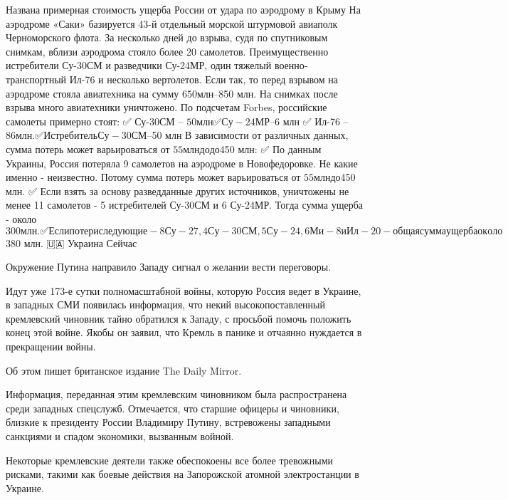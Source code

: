  
 
 
 
 

Названа примерная стоимость ущерба России от удара по аэродрому в Крыму
На аэродроме «Саки» базируется 43-й отдельный морской штурмовой авиаполк Черноморского флота. За несколько дней до взрыва, судя по спутниковым снимкам, вблизи аэродрома стояло более 20 самолетов. Преимущественно истребители Су-30СМ и разведчики Су-24МР, один тяжелый военно-транспортный Ил-76 и несколько вертолетов. Если так, то перед взрывом на аэродроме стояла авиатехника на сумму $650 млн – $850 млн.
На снимках после взрыва много авиатехники уничтожено. По подсчетам Forbes, российские самолеты примерно стоят:
✅ Су-30СМ – $50 млн
✅ Су-24МР – $6 млн
✅ Ил-76 – $86 млн.
✅ Истребитель Су-30СМ – $50 млн
В зависимости от различных данных, сумма потерь может варьироваться от $55 млн до до $450 млн:
✅ По данным Украины, Россия потеряла 9 самолетов на аэродроме в Новофедоровке. Не какие именно - неизвестно. Потому сумма потерь может варьироваться от $55 млн до $450 млн.
✅ Если взять за основу разведданные других источников, уничтожены не менее 11 самолетов - 5 истребителей Су-30СМ и 6 Су-24МР. Тогда сумма ущерба - около $300 млн.
✅ Если потери следующие - 8 Су-27, 4 Су-30СМ, 5 Су-24, 6 Ми-8 и Ил-20 - общая сумма ущерба около $380 млн.
🇺🇦 Украина Сейчас


Окружение Путина направило Западу сигнал о желании вести переговоры.

Идут уже 173-е сутки полномасштабной войны, которую Россия ведет в Украине, в западных СМИ появилась информация, что некий высокопоставленный кремлевский чиновник тайно обратился к Западу, с просьбой помочь положить конец этой войне. Якобы он заявил, что Кремль в панике и отчаянно нуждается в прекращении войны.

Об этом пишет британское издание The Daily Mirror.

Информация, переданная этим кремлевским чиновником была распространена среди западных спецслужб. Отмечается, что старшие офицеры и чиновники, близкие к президенту России Владимиру Путину, встревожены западными санкциями и спадом экономики, вызванным войной.

Некоторые кремлевские деятели также обеспокоены все более тревожными рисками, такими как боевые действия на Запорожской атомной электростанции в Украине.

